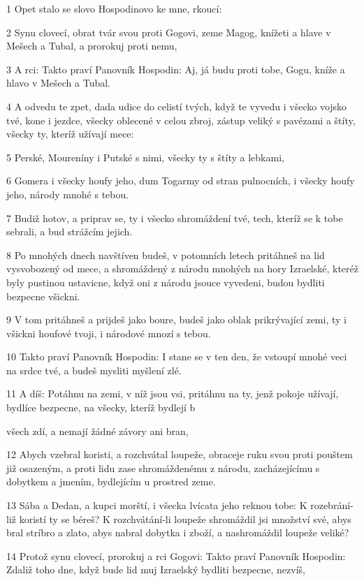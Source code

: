 \par 1 Opet stalo se slovo Hospodinovo ke mne, rkoucí:
\par 2 Synu clovecí, obrat tvár svou proti Gogovi, zeme Magog, knížeti a hlave v Mešech a Tubal, a prorokuj proti nemu,
\par 3 A rci: Takto praví Panovník Hospodin: Aj, já budu proti tobe, Gogu, kníže a hlavo v Mešech a Tubal.
\par 4 A odvedu te zpet, dada udice do celistí tvých, když te vyvedu i všecko vojsko tvé, kone i jezdce, všecky oblecené v celou zbroj, zástup veliký s pavézami a štíty, všecky ty, kteríž užívají mece:
\par 5 Perské, Moureníny i Putské s nimi, všecky ty s štíty a lebkami,
\par 6 Gomera i všecky houfy jeho, dum Togarmy od stran pulnocních, i všecky houfy jeho, národy mnohé s tebou.
\par 7 Budiž hotov, a priprav se, ty i všecko shromáždení tvé, tech, kteríž se k tobe sebrali, a bud strážcím jejich.
\par 8 Po mnohých dnech navštíven budeš, v potomních letech pritáhneš na lid vysvobozený od mece, a shromáždený z národu mnohých na hory Izraelské, kteréž byly pustinou ustavicne, když oni z národu jsouce vyvedeni, budou bydliti bezpecne všickni.
\par 9 V tom pritáhneš a prijdeš jako boure, budeš jako oblak prikrývající zemi, ty i všickni houfové tvoji, i národové mnozí s tebou.
\par 10 Takto praví Panovník Hospodin: I stane se v ten den, že vstoupí mnohé veci na srdce tvé, a budeš mysliti myšlení zlé.
\par 11 A díš: Potáhnu na zemi, v níž jsou vsi, pritáhnu na ty, jenž pokoje užívají, bydlíce bezpecne, na všecky, kteríž bydlejí b\par všech zdí, a nemají žádné závory ani bran,
\par 12 Abych vzebral koristi, a rozchvátal loupeže, obraceje ruku svou proti pouštem již osazeným, a proti lidu zase shromáždenému z národu, zacházejícímu s dobytkem a jmením, bydlejícím u prostred zeme.
\par 13 Sába a Dedan, a kupci morští, i všecka lvícata jeho reknou tobe: K rozebrání-liž koristí ty se béreš? K rozchvátání-li loupeže shromáždil jsi množství své, abys bral stríbro a zlato, abys nabral dobytka i zboží, a nashromáždil loupeže veliké?
\par 14 Protož synu clovecí, prorokuj a rci Gogovi: Takto praví Panovník Hospodin: Zdaliž toho dne, když bude lid muj Izraelský bydliti bezpecne, nezvíš,

